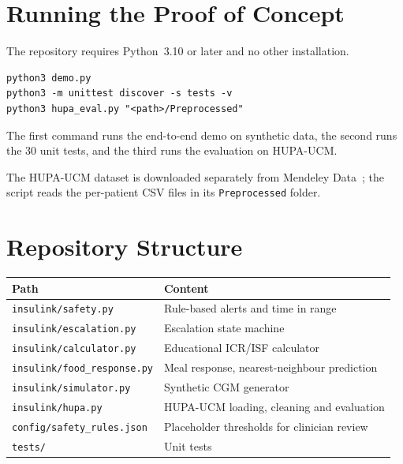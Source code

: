 \section{Running the Proof of Concept}
The repository requires Python~3.10 or later and no other installation.

\begin{verbatim}
python3 demo.py
python3 -m unittest discover -s tests -v
python3 hupa_eval.py "<path>/Preprocessed"
\end{verbatim}
The first command runs the end-to-end demo on synthetic data, the second runs the 30 unit tests, and the third runs the evaluation on HUPA-UCM.

{\sloppy The HUPA-UCM dataset is downloaded separately from Mendeley Data~\cite{hupa2024}; the script reads the per-patient CSV files in its \texttt{Preprocessed} folder.\par}

\section{Repository Structure}
\begin{tabularx}{\textwidth}{lX}
\hline
Path & Content \\
\hline
\texttt{insulink/safety.py} & Rule-based alerts and time in range \\
\texttt{insulink/escalation.py} & Escalation state machine \\
\texttt{insulink/calculator.py} & Educational ICR/ISF calculator \\
\texttt{insulink/food\_response.py} & Meal response, nearest-neighbour prediction \\
\texttt{insulink/simulator.py} & Synthetic CGM generator \\
\texttt{insulink/hupa.py} & HUPA-UCM loading, cleaning and evaluation \\
\texttt{config/safety\_rules.json} & Placeholder thresholds for clinician review \\
\texttt{tests/} & Unit tests \\
\hline
\end{tabularx}
